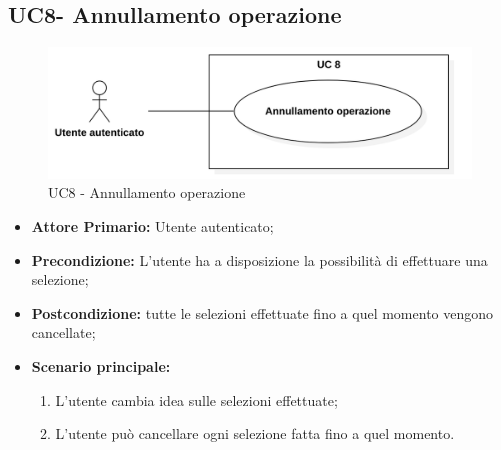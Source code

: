 \subsection{UC8- Annullamento operazione}
\begin{figure}[H]
    \centering
    \includegraphics[scale = 0.7]{components/img/UC8.png}
    \caption{UC8 - Annullamento operazione}
\end{figure}
\begin{itemize}
\item \textbf{Attore Primario:} Utente autenticato;
\item \textbf{Precondizione:} L'utente ha a disposizione la possibilità di effettuare una selezione;
\item \textbf{Postcondizione:} tutte le selezioni effettuate fino a quel momento vengono cancellate;
\item \textbf{Scenario principale:}
    \begin{enumerate}
    \item L'utente cambia idea sulle selezioni effettuate;
    \item L'utente può cancellare ogni selezione fatta fino a quel momento.
    \end{enumerate}
\end{itemize}